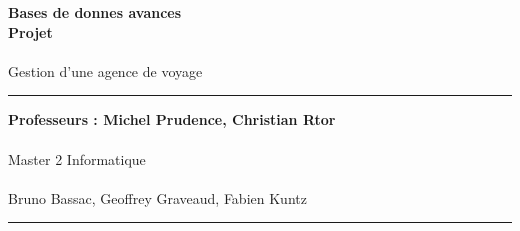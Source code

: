 \documentclass[a4paper]{article}
\newlength{\larg}
\begin{document}
\thispagestyle{empty}

\setlength{\unitlength}{1in}


\begin{flushright}
 \noindent {\rule{\larg}{0.5mm}}
\end{flushright}
\vspace{7mm}
\begin{flushright}
 \Huge{\bf Bases de donnes avances} \\
 \Huge{\bf Projet} \\
 ~\\
 \huge{Gestion d'une agence de voyage}\\
\end{flushright}
\vspace{7mm}
\begin{flushright}
 {\rule{\larg}{0.5mm}}
\end{flushright}
\vspace{2mm}
\begin{flushright}
 \large{\bf Professeurs : Michel Prudence, Christian Rtor} \\
 ~\\
 \large{Master 2 Informatique}\\
 ~\\
 \vspace{9cm}
 \large{Bruno Bassac, Geoffrey Graveaud, Fabien Kuntz}
{\rule{\larg}{0.5mm}}
\end{flushright}

\newpage

\addtolength{\oddsidemargin}{1cm}

\thispagestyle{empty}
\tableofcontents
\newpage

\setcounter{page}{1}














\end{document}
